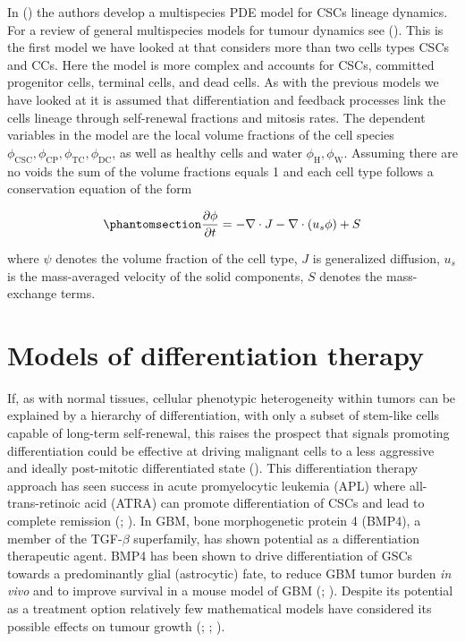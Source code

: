 \documentclass[
  letterpaper,
]{scrreprt}
\theoremstyle{definition}
\theoremstyle{remark}
\begin{document}
In () the authors
develop a multispecies PDE model for CSCs lineage dynamics. For a review
of general multispecies models for tumour dynamics see
(). This is the first
model we have looked at that considers more than two cells types CSCs
and CCs. Here the model is more complex and accounts for CSCs, committed
progenitor cells, terminal cells, and dead cells. As with the previous
models we have looked at it is assumed that differentiation and feedback
processes link the cells lineage through self-renewal fractions and
mitosis rates. The dependent variables in the model are the local volume
fractions of the cell species
\(\phi_\text{CSC}, \phi_\text{CP}, \phi_\text{TC}, \phi_\text{DC}\), as
well as healthy cells and water \(\phi_\text{H}, \phi_\text{W}\).
Assuming there are no voids the sum of the volume fractions equals 1 and
each cell type follows a conservation equation of the form

\begin{equation}\phantomsection\label{eq-youssefpour-multispecies}{
\frac{\partial \phi}{\partial t} = - \nabla \cdot J - \nabla \cdot (u_s \phi) + S
}\end{equation}

where \(\psi\) denotes the volume fraction of the cell type, \(J\) is
generalized diffusion, \(u_s\) is the mass-averaged velocity of the
solid components, \(S\) denotes the mass-exchange terms.

\section{Models of differentiation
therapy}\label{sec-models-of-differentiation-therapy}

If, as with normal tissues, cellular phenotypic heterogeneity within
tumors can be explained by a hierarchy of differentiation, with only a
subset of stem-like cells capable of long-term self-renewal, this raises
the prospect that signals promoting differentiation could be effective
at driving malignant cells to a less aggressive and ideally post-mitotic
differentiated state (). This differentiation therapy approach has seen success
in acute promyelocytic leukemia (APL) where all-trans-retinoic acid
(ATRA) can promote differentiation of CSCs and lead to complete
remission (;
). In GBM, bone morphogenetic
protein 4 (BMP4), a member of the TGF-\(\beta\) superfamily, has shown
potential as a differentiation therapeutic agent. BMP4 has been shown to
drive differentiation of GSCs towards a predominantly glial (astrocytic)
fate, to reduce GBM tumor burden \emph{in vivo} and to improve survival
in a mouse model of GBM (;
). Despite its
potential as a treatment option relatively few mathematical models have
considered its possible effects on tumour growth
(;
;
).
\end{document}
